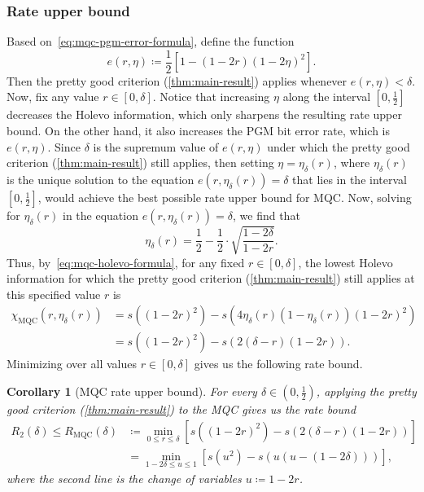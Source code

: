 \documentclass[11pt]{article}
\renewcommand{\leq}{\leqslant}
\newtheorem{corollary}[corollary]{Corollary}
\theoremstyle{remark}
\newcommand{\MQC}{\mathrm{MQC}}
\begin{document}
\subsubsection{Rate upper bound}
\label{subsubsec:mqc-rate}

Based on~\cref{eq:mqc-pgm-error-formula}, define the function
\begin{equation}
\label{eq:mqc-error-function}
e(r,\eta) \coloneqq \frac{1}{2}\left[1-(1-2r)(1-2\eta)^2\right].
\end{equation}
Then the pretty good criterion (\cref{thm:main-result}) applies whenever $e(r,\eta) < \delta$. Now, fix any value $r \in [0,\delta]$. Notice that increasing $\eta$ along the interval $[0,\frac{1}{2}]$ decreases the Holevo information, which only sharpens the resulting rate upper bound. On the other hand, it also increases the PGM bit error rate, which is $e(r,\eta)$. Since $\delta$ is the supremum value of $e(r,\eta)$ under which the pretty good criterion (\cref{thm:main-result}) still applies, then setting $\eta = \eta_\delta(r)$, where $\eta_\delta(r)$ is the unique solution to the equation $e(r,\eta_\delta(r)) = \delta$ that lies in the interval $[0,\frac{1}{2}]$, would achieve the best possible rate upper bound for MQC. Now, solving for $\eta_\delta(r)$ in the equation $e(r,\eta_\delta(r)) = \delta$, we find that 
\begin{equation*}
\eta_\delta(r) = \frac{1}{2} - \frac{1}{2} \cdot \sqrt{\frac{1-2\delta}{1-2r}}.
\end{equation*}
Thus, by~\cref{eq:mqc-holevo-formula}, for any fixed $r \in [0,\delta]$, the lowest Holevo information for which the pretty good criterion (\cref{thm:main-result}) still applies at this specified value $r$ is
\begin{align*}
\chi_{\MQC}(r,\eta_\delta(r)) &= s\left((1-2r)^2\right)-s\left(4\eta_\delta(r)(1-\eta_\delta(r))(1-2r)^2\right) \\
&= s\left((1-2r)^2\right)-s\left(2(\delta-r)(1-2r)\right).
\end{align*}
Minimizing over all values $r \in [0,\delta]$ gives us the following rate bound.
\begin{corollary}[MQC rate upper bound]
\label{cor:mqc-rate}
For every $\delta \in (0,\frac{1}{2})$, applying the pretty good criterion (\cref{thm:main-result}) to the MQC gives us the rate bound
\begin{equation}
\label{eq:mixed-rate-bound}
\begin{aligned}
R_2(\delta)
\leq R_{\MQC}(\delta)
&\coloneqq
\min_{0 \leq r \leq \delta}
\left[s\left((1-2r)^2\right)-s\left(2(\delta-r)(1-2r)\right)\right] \\
&=
\min_{1-2\delta \leq u \leq 1}
\left[s(u^2)-s\left(u(u-(1-2\delta))\right)\right],
\end{aligned}
\end{equation}
where the second line is the change of variables $u \coloneqq 1-2r$.
\end{corollary}
\end{document}

